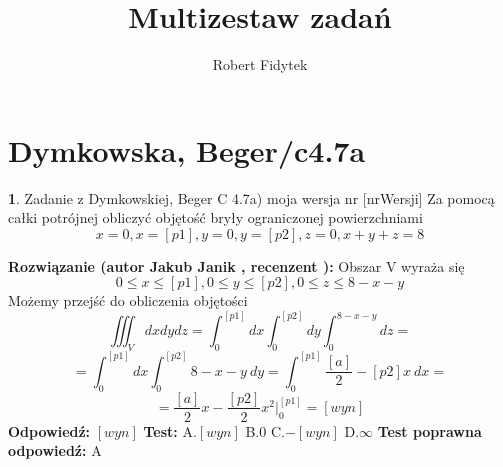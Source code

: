 \documentclass[12pt, a4paper]{article}
\title{Multizestaw zadań}
\author{Robert Fidytek}
\date{}
\theoremstyle{definition} %
\newtheorem{zad}{}
\newcommand{\kategoria}[1]{\section{#1}} %
\newcommand{\zadStart}[1]{\begin{zad}#1\newline} %
\newcommand{\zadStop}{\end{zad}}   %
\newcommand{\rozwStart}[2]{\noindent \textbf{Rozwiązanie (autor #1 , recenzent #2): }\newline} %
\newcommand{\rozwStop}{\newline}                                            %
\newcommand{\odpStart}{\noindent \textbf{Odpowiedź:}\newline}    %
\newcommand{\odpStop}{\newline}                                             %
\newcommand{\testStart}{\noindent \textbf{Test:}\newline} %
\newcommand{\testStop}{\newline} %
\newcommand{\kluczStart}{\noindent \textbf{Test poprawna odpowiedź:}\newline} %
\newcommand{\kluczStop}{\newline} %
\begin{document}
\maketitle


\kategoria{Dymkowska, Beger/c4.7a}
\zadStart{Zadanie z Dymkowskiej, Beger C 4.7a) moja wersja nr [nrWersji]}
Za pomocą całki potrójnej obliczyć objętość bryły ograniczonej powierzchniami
$$x=0, x=[p1], y=0, y=[p2], z=0, x+y+z=8$$
\zadStop
\rozwStart{Jakub Janik}{}
Obszar V wyraża się $$0 \leq x \leq [p1], 0 \leq y \leq [p2], 0 \leq z \leq 8-x-y$$
Możemy przejść do obliczenia objętości
$$\iiint_V dxdydz=\int_0^{[p1]}dx\int_0^{[p2]}dy\int_0^{8-x-y}dz=$$
$$=\int_0^{[p1]}dx\int_0^{[p2]}8-x-y\ dy=\int_0^{[p1]}\frac{[a]}{2}-[p2]x\ dx=$$
$$=\frac{[a]}{2}x-\frac{[p2]}{2}x^2\Big|_0^{[p1]}=[wyn]$$
\rozwStop
\odpStart
$[wyn]$
\odpStop
\testStart
A.$[wyn]$
B.$0$
C.$-[wyn]$
D.$\infty$
\testStop
\kluczStart
A
\kluczStop
\end{document}
